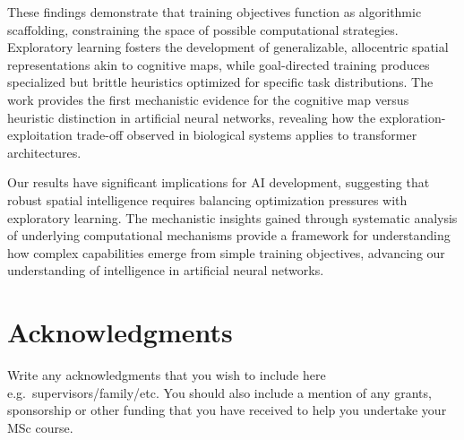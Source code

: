 \documentclass[11pt,a4paper,oneside]{book}
\begin{document}
These findings demonstrate that training objectives function as algorithmic scaffolding, constraining the space of possible computational strategies. Exploratory learning fosters the development of generalizable, allocentric spatial representations akin to cognitive maps, while goal-directed training produces specialized but brittle heuristics optimized for specific task distributions. The work provides the first mechanistic evidence for the cognitive map versus heuristic distinction in artificial neural networks, revealing how the exploration-exploitation trade-off observed in biological systems applies to transformer architectures.

Our results have significant implications for AI development, suggesting that robust spatial intelligence requires balancing optimization pressures with exploratory learning. The mechanistic insights gained through systematic analysis of underlying computational mechanisms provide a framework for understanding how complex capabilities emerge from simple training objectives, advancing our understanding of intelligence in artificial neural networks.
\newpage 
\section*{Acknowledgments}
Write any acknowledgments that you wish to include here e.g.~supervisors/family/etc. You should also include a mention of any grants, sponsorship or other funding that you have received to help you undertake your MSc course.
\newpage
\setcounter{tocdepth}{2} 
\cleardoublepage
\tableofcontents
\cleardoublepage
\listoffigures
\cleardoublepage
\listoftables

\mainmatter


















\end{document}
